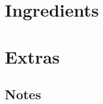\documentclass[twoside,english]{book}
\begin{document}
\begin{mainmatter}
\appendix

\chapter{Ingredients}

\chapter{Extras}
\newpage
{}\newpage
{}\newpage
{}\newpage

\section{Notes}
~\newpage
~\newpage
~\newpage
~\newpage
~\newpage
~\newpage
~\newpage

\end{mainmatter}

\begin{backmatter}

\newpage
\printindex
\end{backmatter}
\end{document}
